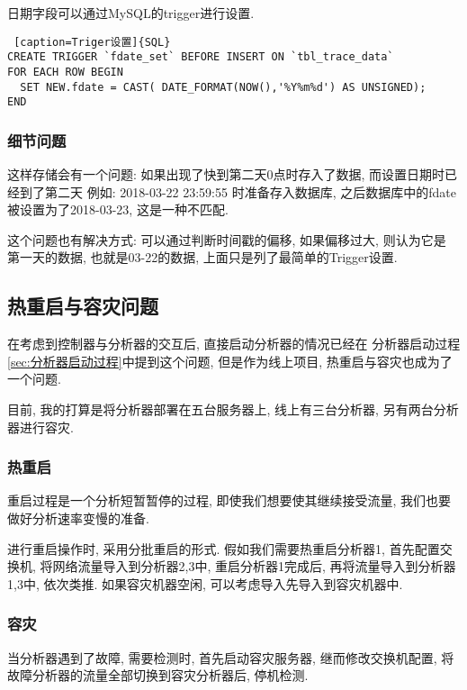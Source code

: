 日期字段可以通过MySQL的trigger进行设置.


\begin{lstlisting} [caption=Triger设置]{SQL}
CREATE TRIGGER `fdate_set` BEFORE INSERT ON `tbl_trace_data`
FOR EACH ROW BEGIN
  SET NEW.fdate = CAST( DATE_FORMAT(NOW(),'%Y%m%d') AS UNSIGNED);
END
\end{lstlisting}

\subsubsection{细节问题}

这样存储会有一个问题: 如果出现了快到第二天0点时存入了数据,
而设置日期时已经到了第二天 例如: 2018-03-22 23:59:55 时准备存入数据库,
之后数据库中的fdate被设置为了2018-03-23, 这是一种不匹配.

这个问题也有解决方式: 可以通过判断时间戳的偏移, 如果偏移过大, 则认为它是
第一天的数据, 也就是03-22的数据, 上面只是列了最简单的Trigger设置.

\subsection{热重启与容灾问题}
\label{sec:热重启与容灾问题}

在考虑到控制器与分析器的交互后, 直接启动分析器的情况已经在
分析器启动过程\ref{sec:分析器启动过程}中提到这个问题,
但是作为线上项目, 热重启与容灾也成为了一个问题.

目前, 我的打算是将分析器部署在五台服务器上, 线上有三台分析器, 另有两台分析器进行容灾.

\subsubsection{热重启}

重启过程是一个分析短暂暂停的过程, 即使我们想要使其继续接受流量,
我们也要做好分析速率变慢的准备.


进行重启操作时, 采用分批重启的形式. 假如我们需要热重启分析器1,
首先配置交换机, 将网络流量导入到分析器2,3中, 重启分析器1完成后,
再将流量导入到分析器1,3中, 依次类推. 如果容灾机器空闲,
可以考虑导入先导入到容灾机器中.

\subsubsection{容灾}

当分析器遇到了故障, 需要检测时, 首先启动容灾服务器, 继而修改交换机配置,
将故障分析器的流量全部切换到容灾分析器后, 停机检测.

